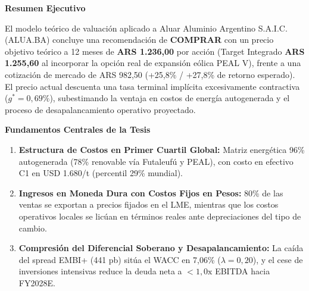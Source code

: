 \documentclass[10pt,a4paper]{article}
\newcommand{\coverheading}[1]{{\georgiahead\bfseries\color{gsnavy}\normalsize #1}\par\vspace{1pt}}
\begin{document}
\noindent
\begin{minipage}[t]{0.55\textwidth}
    \coverheading{Resumen Ejecutivo}
    {\small El modelo teórico de valuación aplicado a Aluar Aluminio Argentino S.A.I.C. (ALUA.BA) concluye una recomendación de \textbf{COMPRAR} con un precio objetivo teórico a 12 meses de \textbf{ARS 1.236,00} por acción (Target Integrado \textbf{ARS 1.255,60} al incorporar la opción real de expansión eólica PEAL V), frente a una cotización de mercado de ARS 982,50 (+25,8\% / +27,8\% de retorno esperado). El precio actual descuenta una tasa terminal implícita excesivamente contractiva ($g^* = 0,69\%$), subestimando la ventaja en costos de energía autogenerada y el proceso de desapalancamiento operativo proyectado.}

    \vspace{0.15cm}
    \coverheading{Fundamentos Centrales de la Tesis}
    \begin{enumerate}
        \setlength{\itemsep}{2pt}
        \item \textbf{Estructura de Costos en Primer Cuartil Global:} Matriz energética 96\% autogenerada (78\% renovable vía Futaleufú y PEAL), con costo en efectivo C1 en USD 1.680/t (percentil 29\% mundial).
        \item \textbf{Ingresos en Moneda Dura con Costos Fijos en Pesos:} 80\% de las ventas se exportan a precios fijados en el LME, mientras que los costos operativos locales se licúan en términos reales ante depreciaciones del tipo de cambio.
        \item \textbf{Compresión del Diferencial Soberano y Desapalancamiento:} La caída del spread EMBI+ (441 pb) sitúa el WACC en 7,06\% ($\lambda=0,20$), y el cese de inversiones intensivas reduce la deuda neta a $<1,0\text{x}$ EBITDA hacia FY2028E.
    \end{enumerate}
\end{minipage}%
\hfill
\end{document}
